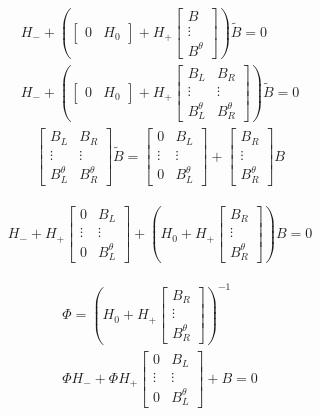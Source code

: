 \documentclass{article}
\begin{document}
{\begin{gather*}
  H_{-} + 
(  \begin{bmatrix}
    0&H_0
  \end{bmatrix} + H_+ 
  \begin{bmatrix}
    B\\\vdots\\B^\theta
  \end{bmatrix})\tilde{B} = 0\\
  H_{-} + 
(  \begin{bmatrix}
    0&H_0
  \end{bmatrix} + H_+ 
  \begin{bmatrix}
    B_L&B_R\\\vdots&\vdots\\B^\theta_L&B^\theta_R
  \end{bmatrix})\tilde{B} = 0
\end{gather*}
\begin{gather*}
    \begin{bmatrix}
    B_L&B_R\\\vdots&\vdots\\B^\theta_L&B^\theta_R
  \end{bmatrix}\tilde{B} = 
  \begin{bmatrix}
    0&B_L\\\vdots&\vdots\\0&B^\theta_L
  \end{bmatrix}+
  \begin{bmatrix}
    B_R\\\vdots\\B^\theta_R
  \end{bmatrix}B
\end{gather*}

\begin{gather*}
  H_- + H_+  \begin{bmatrix}
    0&B_L\\\vdots&\vdots\\0&B^\theta_L
  \end{bmatrix}    + (H_0 + H_+  \begin{bmatrix}
    B_R\\\vdots\\B^\theta_R
  \end{bmatrix})B=0
\end{gather*}

\begin{gather*}
  \Phi= (H_0 + H_+  \begin{bmatrix}
    B_R\\\vdots\\B^\theta_R
  \end{bmatrix})^{-1}\\
\Phi H_- + \Phi H_+  \begin{bmatrix}
    0&B_L\\\vdots&\vdots\\0&B^\theta_L
  \end{bmatrix}  +B = 0
\end{gather*}


}
\end{document}

